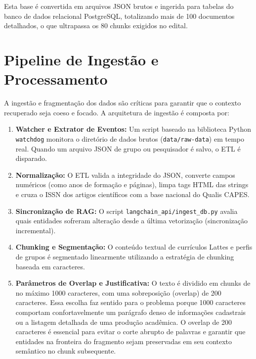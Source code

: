 \documentclass[12pt,a4paper]{article}
\begin{document}
Esta base é convertida em arquivos JSON brutos e ingerida para tabelas do banco de dados relacional PostgreSQL, totalizando mais de 100 documentos detalhados, o que ultrapassa os 80 chunks exigidos no edital.

\section{Pipeline de Ingestão e Processamento}
A ingestão e fragmentação dos dados são críticas para garantir que o contexto recuperado seja coeso e focado. A arquitetura de ingestão é composta por:
\begin{enumerate}
    \item \textbf{Watcher e Extrator de Eventos:} Um script baseado na biblioteca Python \texttt{watchdog} monitora o diretório de dados brutos (\texttt{data/raw-data}) em tempo real. Quando um arquivo JSON de grupo ou pesquisador é salvo, o ETL é disparado.
    \item \textbf{Normalização:} O ETL valida a integridade do JSON, converte campos numéricos (como anos de formação e páginas), limpa tags HTML das strings e cruza o ISSN dos artigos científicos com a base nacional do Qualis CAPES.
    \item \textbf{Sincronização de RAG:} O script \texttt{langchain\_api/ingest\_db.py} avalia quais entidades sofreram alteração desde a última vetorização (sincronização incremental).
    \item \textbf{Chunking e Segmentação:} O conteúdo textual de currículos Lattes e perfis de grupos é segmentado linearmente utilizando a estratégia de chunking baseada em caracteres. 
    \item \textbf{Parâmetros de Overlap e Justificativa:} O texto é dividido em chunks de no máximo 1000 caracteres, com uma sobreposição (overlap) de 200 caracteres. Essa escolha faz sentido para o problema porque 1000 caracteres comportam confortavelmente um parágrafo denso de informações cadastrais ou a listagem detalhada de uma produção acadêmica. O overlap de 200 caracteres é essencial para evitar o corte abrupto de palavras e garantir que entidades na fronteira do fragmento sejam preservadas em seu contexto semântico no chunk subsequente.
\end{enumerate}
\end{document}

